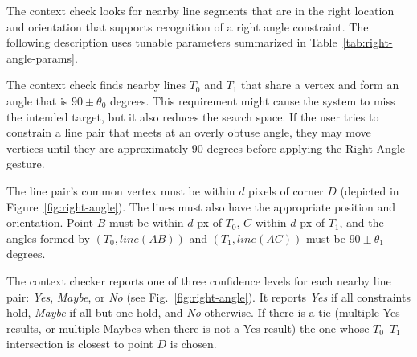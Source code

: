 The context check looks for nearby line segments that are in the right
location and orientation that supports recognition of a right angle
constraint.  The following description uses tunable parameters
summarized in Table~\ref{tab:right-angle-params}. 

The context check finds nearby lines $T_0$ and $T_1$ that share a
vertex and form an angle that is $90\pm\theta_0$ degrees. This
requirement might cause the system to miss the intended target, but it
also reduces the search space. If the user tries to constrain a line
pair that meets at an overly obtuse angle, they may move vertices
until they are approximately 90 degrees before applying the Right
Angle gesture.

The line pair's common vertex must be within $d$ pixels of corner $D$
(depicted in Figure~\ref{fig:right-angle}). The lines must also have
the appropriate position and orientation. Point $B$ must be within $d$
px of $T_0$, $C$ within $d$ px of $T_1$, and the angles formed by
$(T_0, line(AB))$ and $(T_1, line(AC))$ must be $90\pm\theta_1$ degrees.




The context checker reports one of three confidence levels for each
nearby line pair: \textit{Yes}, \textit{Maybe}, or \textit{No} (see
Fig.~\ref{fig:right-angle}). It reports \textit{Yes} if all
constraints hold, \textit{Maybe} if all but one hold, and \textit{No}
otherwise. If there is a tie (multiple Yes results, or multiple Maybes
when there is not a Yes result) the one whose $T_0$--$T_1$
intersection is closest to point $D$ is chosen.

